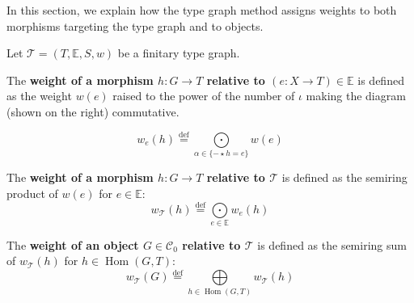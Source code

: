 In this section, we explain how the type graph method assigns weights to both morphisms targeting the type graph and to objects.
\begin{definition}
    \label{def:weight}
    Let $\mathcal{T} = (T,\mathbb{E},S, w)$ be a finitary type graph.
    \newline
    \noindent
    \begin{minipage}{0.6\textwidth}
        The \textbf{weight of a morphism $h: G \rightarrow T$ relative to $(e:X \to T) \in \mathbb{E}$} is defined as the weight $w(e)$ raised to the power of the number of $\iota$ making the diagram (shown on the right) commutative.
    \end{minipage}
    \begin{minipage}{0.29\textwidth}
        \begin{center}
        \end{center} 
    \end{minipage}
                \[
                w_e(h) 
                    \overset{\operatorname{def}}{=}
                \underset{\alpha \in \{- \star h = e\}}{\bigodot}w(e) 
                \]

        \noindent
        The \textbf{weight of a morphism $h: G \rightarrow T$ relative to \(\mathcal{T}\)} is defined as the semiring product of $w(e)$ for $e \in \mathbb{E}$:
        \[  w_\mathcal{T}(h) \overset{\operatorname{def}}{=} \underset{e \in \mathbb{E}}{\bigodot} 
                w_e(h) \]

        \noindent
       The \textbf{weight of an object \( G \in \mathcal{C}_0 \) relative to \( \mathcal{T}\)} is defined as the semiring sum of $w_\mathcal{T}(h)$ for $h \in \operatorname{Hom}(G,T)$:
        \[w_\mathcal{T}(G) \overset{\operatorname{def}}{=} \underset{h \in \operatorname{Hom}(G,T)}{\bigoplus}  w_\mathcal{T}(h) \]
\end{definition}


